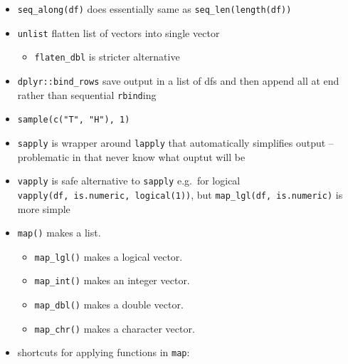 \documentclass[]{book}
\newenvironment{Shaded}{\begin{snugshade}}{\end{snugshade}}
\newcommand{\ControlFlowTok}[1]{\textcolor[rgb]{0.13,0.29,0.53}{\textbf{#1}}}
\newcommand{\DataTypeTok}[1]{\textcolor[rgb]{0.13,0.29,0.53}{#1}}
\newcommand{\KeywordTok}[1]{\textcolor[rgb]{0.13,0.29,0.53}{\textbf{#1}}}
\newcommand{\NormalTok}[1]{#1}
\newcommand{\OperatorTok}[1]{\textcolor[rgb]{0.81,0.36,0.00}{\textbf{#1}}}
\newcommand{\StringTok}[1]{\textcolor[rgb]{0.31,0.60,0.02}{#1}}
\providecommand{\tightlist}{%
  \setlength{\itemsep}{0pt}\setlength{\parskip}{0pt}}
\theoremstyle{definition}
\theoremstyle{definition}
\theoremstyle{definition}
\theoremstyle{remark}
\begin{document}
\begin{itemize}
\tightlist
\item
  \texttt{seq\_along(df)} does essentially same as
  \texttt{seq\_len(length(df))}
\item
  \texttt{unlist} flatten list of vectors into single vector

  \begin{itemize}
  \tightlist
  \item
    \texttt{flaten\_dbl} is stricter alternative
  \end{itemize}
\item
  \texttt{dplyr::bind\_rows} save output in a list of dfs and then
  append all at end rather than sequential \texttt{rbind}ing
\item
  \texttt{sample(c("T",\ "H"),\ 1)}
\item
  \texttt{sapply} is wrapper around \texttt{lapply} that automatically
  simplifies output -- problematic in that never know what ouptut will
  be
\item
  \texttt{vapply} is safe alternative to \texttt{sapply} e.g.~for
  logical \texttt{vapply(df,\ is.numeric,\ logical(1))}, but
  \texttt{map\_lgl(df,\ is.numeric)} is more simple
\item
  \texttt{map()} makes a list.

  \begin{itemize}
  \tightlist
  \item
    \texttt{map\_lgl()} makes a logical vector.
  \item
    \texttt{map\_int()} makes an integer vector.
  \item
    \texttt{map\_dbl()} makes a double vector.
  \item
    \texttt{map\_chr()} makes a character vector.
  \end{itemize}
\item
  shortcuts for applying functions in \texttt{map}:
\end{itemize}

\begin{Shaded}
\end{Shaded}
\end{document}
